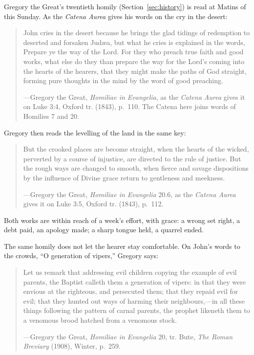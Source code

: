 \noindent Gregory the Great's twentieth homily (Section~\ref{sec:history}) is read at Matins of
this Sunday. As the \textit{Catena Aurea} gives his words on the cry in the desert:

\begin{quote}
John cries in the desert because he brings the glad tidings of redemption to deserted and
forsaken Judæa, but what he cries is explained in the words, Prepare ye the way of the Lord. For
they who preach true faith and good works, what else do they than prepare the way for the Lord's
coming into the hearts of the hearers, that they might make the paths of God straight, forming pure
thoughts in the mind by the word of good preaching.\par
{\smallskip\noindent\small ---Gregory the Great, \textit{Homiliae in Evangelia}, as the
\textit{Catena Aurea} gives it on Luke 3:4, Oxford tr. (1843), p.~110. The Catena here joins words
of Homilies 7 and 20.\par}
\end{quote}

\noindent Gregory then reads the levelling of the land in the same key:

\begin{quote}
But the crooked places are become straight, when the hearts of the wicked, perverted by a course of
injustice, are directed to the rule of justice. But the rough ways are changed to smooth, when
fierce and savage dispositions by the influence of Divine grace return to gentleness and
meekness.\par
{\smallskip\noindent\small ---Gregory the Great, \textit{Homiliae in Evangelia} 20.6, as the
\textit{Catena Aurea} gives it on Luke 3:5, Oxford tr. (1843), p.~112.\par}
\end{quote}

Both works are within reach of a week's effort, with grace: a wrong set right, a debt paid, an
apology made; a sharp tongue held, a quarrel ended.

The same homily does not let the hearer stay comfortable. On John's words to the crowds, ``O
generation of vipers,'' Gregory says:

\begin{quote}
Let us remark that addressing evil children copying the example of evil parents, the Baptist
calleth them a generation of vipers: in that they were envious at the righteous, and persecuted
them; that they repaid evil for evil; that they hunted out ways of harming their neighbours,---in
all these things following the pattern of carnal parents, the prophet likeneth them to a venomous
brood hatched from a venomous stock.\par
{\smallskip\noindent\small ---Gregory the Great, \textit{Homiliae in Evangelia} 20, tr. Bute,
\textit{The Roman Breviary} (1908), Winter, p.~259.\par}
\end{quote}

